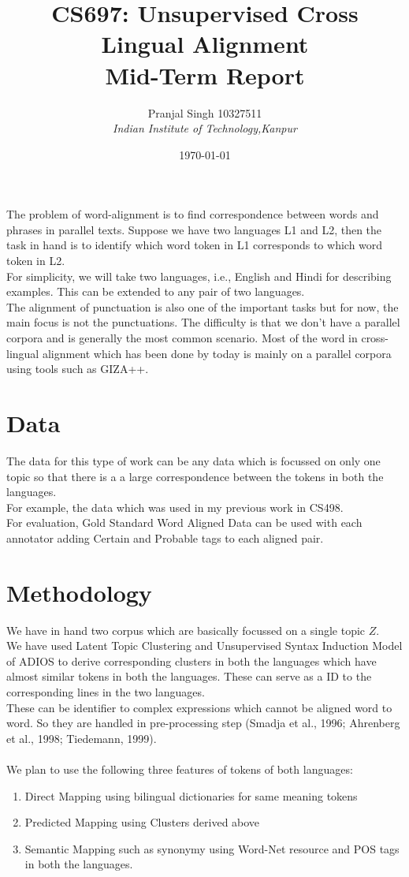 \documentclass{article}
\title{\textbf{CS697: Unsupervised Cross Lingual Alignment\\ Mid-Term Report}}
\author{\normalsize Pranjal Singh 10327511\\
\emph{Indian Institute of Technology,Kanpur}}
\date{\today}
\begin{document}
\maketitle

The problem of word-alignment is to find correspondence between words and phrases in parallel texts. Suppose we have two languages L1 and L2, then the task in hand is to identify which word token in L1 corresponds to which word token in L2.\\
For simplicity, we will take two languages, i.e., English and Hindi for describing examples. This can be extended to any pair of two languages.\\
The alignment of punctuation is also one of the important tasks but for now, the main focus is not the punctuations.
The difficulty is that we don't have a parallel corpora and is generally the most common scenario. Most of the word in cross-lingual alignment which has been done by today is mainly on a parallel corpora using tools such as GIZA++.\\

\section{Data}
The data for this type of work can be any data which is focussed on only one topic so that there is a a large correspondence between the tokens in both the languages.\\
For example, the data which was used in my previous work in CS498.\\
For evaluation, Gold Standard Word Aligned Data can be used with each annotator adding Certain and Probable tags to each aligned pair.\\

\section{Methodology}
We have in hand two corpus which are basically focussed on a single topic $Z$.\\
We have used Latent Topic Clustering and Unsupervised Syntax Induction Model of ADIOS to derive corresponding clusters in both the languages which have almost similar tokens in both the languages. These can serve as a ID to the corresponding lines in the two languages.\\
These can be identifier to complex expressions which cannot be aligned word to word. So they are handled in pre-processing step (Smadja et al., 1996; Ahrenberg et al., 1998; Tiedemann, 1999).\\\\
We plan to use the following three features of tokens of both languages:
\begin{enumerate}
\item Direct Mapping using bilingual dictionaries for same meaning tokens
\item Predicted Mapping using Clusters derived above
\item Semantic Mapping such as synonymy using Word-Net resource and POS tags in both the languages.
\end{enumerate}
\end{document}
